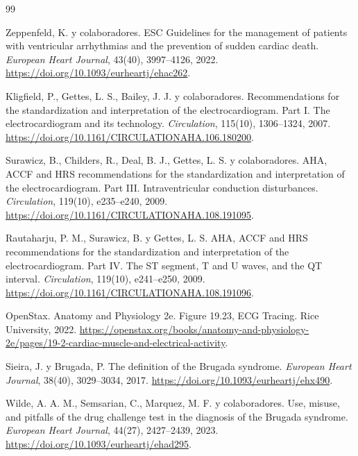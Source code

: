 \cleardoublepage
\begin{thebibliography}{99}

Zeppenfeld, K. y colaboradores.
 ESC Guidelines for the management of patients with ventricular arrhythmias and the prevention of sudden cardiac death.
\newblock \emph{European Heart Journal}, 43(40), 3997--4126, 2022.
\newblock \url{https://doi.org/10.1093/eurheartj/ehac262}.

Kligfield, P., Gettes, L. S., Bailey, J. J. y colaboradores.
\newblock Recommendations for the standardization and interpretation of the electrocardiogram. Part I. The electrocardiogram and its technology.
\newblock \emph{Circulation}, 115(10), 1306--1324, 2007.
\newblock \url{https://doi.org/10.1161/CIRCULATIONAHA.106.180200}.

Surawicz, B., Childers, R., Deal, B. J., Gettes, L. S. y colaboradores.
\newblock AHA, ACCF and HRS recommendations for the standardization and interpretation of the electrocardiogram. Part III. Intraventricular conduction disturbances.
\newblock \emph{Circulation}, 119(10), e235--e240, 2009.
\newblock \url{https://doi.org/10.1161/CIRCULATIONAHA.108.191095}.

Rautaharju, P. M., Surawicz, B. y Gettes, L. S.
\newblock AHA, ACCF and HRS recommendations for the standardization and interpretation of the electrocardiogram. Part IV. The ST segment, T and U waves, and the QT interval.
\newblock \emph{Circulation}, 119(10), e241--e250, 2009.
\newblock \url{https://doi.org/10.1161/CIRCULATIONAHA.108.191096}.

OpenStax.
\newblock Anatomy and Physiology 2e. Figure 19.23, ECG Tracing.
\newblock Rice University, 2022.
\newblock \url{https://openstax.org/books/anatomy-and-physiology-2e/pages/19-2-cardiac-muscle-and-electrical-activity}.

Sieira, J. y Brugada, P.
\newblock The definition of the Brugada syndrome.
\newblock \emph{European Heart Journal}, 38(40), 3029--3034, 2017.
\newblock \url{https://doi.org/10.1093/eurheartj/ehx490}.

Wilde, A. A. M., Semsarian, C., Marquez, M. F. y colaboradores.
\newblock Use, misuse, and pitfalls of the drug challenge test in the diagnosis of the Brugada syndrome.
\newblock \emph{European Heart Journal}, 44(27), 2427--2439, 2023.
\newblock \url{https://doi.org/10.1093/eurheartj/ehad295}.


\end{thebibliography}

